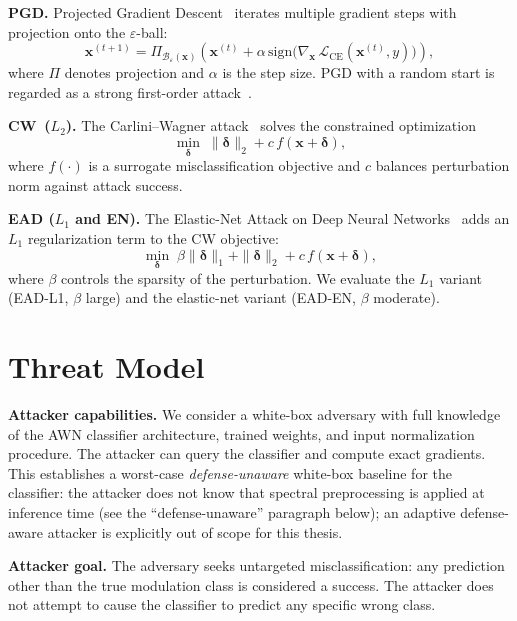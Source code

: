 \textbf{PGD.}
Projected Gradient Descent~\cite{madry2018pgd} iterates multiple gradient
steps with projection onto the $\varepsilon$-ball:
\begin{equation}
  \mathbf{x}^{(t+1)} = \Pi_{\mathcal{B}_\varepsilon(\mathbf{x})}
    \!\left(\mathbf{x}^{(t)} + \alpha\,\mathrm{sign}\!\bigl(
    \nabla_{\mathbf{x}}\,\mathcal{L}_{\mathrm{CE}}(\mathbf{x}^{(t)}, y)
    \bigr)\right),
\end{equation}
where $\Pi$ denotes projection and $\alpha$ is the step size. PGD with a
random start is regarded as a strong first-order
attack~\cite{croce2020reliable}.

\textbf{CW~($L_2$).}
The Carlini--Wagner attack~\cite{carlini2017towards} solves the constrained
optimization
\begin{equation}
  \min_{\boldsymbol{\delta}}\; \|\boldsymbol{\delta}\|_2 + c\, f(\mathbf{x} + \boldsymbol{\delta}),
\end{equation}
where $f(\cdot)$ is a surrogate misclassification objective and $c$ balances
perturbation norm against attack success.

\textbf{EAD ($L_1$ and EN).}
The Elastic-Net Attack on Deep Neural Networks~\cite{chen2020ead} adds an
$L_1$ regularization term to the CW objective:
\begin{equation}
  \min_{\boldsymbol{\delta}}\; \beta\|\boldsymbol{\delta}\|_1 +
    \|\boldsymbol{\delta}\|_2 + c\, f(\mathbf{x} + \boldsymbol{\delta}),
\end{equation}
where $\beta$ controls the sparsity of the perturbation. We evaluate the
$L_1$ variant (EAD-L1, $\beta$ large) and the elastic-net variant (EAD-EN,
$\beta$ moderate).

\section{Threat Model}

\textbf{Attacker capabilities.}
We consider a white-box adversary with full knowledge of the AWN classifier
architecture, trained weights, and input normalization procedure. The
attacker can query the classifier and compute exact gradients. This
establishes a worst-case \emph{defense-unaware} white-box baseline for
the classifier: the attacker does not know that spectral preprocessing
is applied at inference time (see the ``defense-unaware'' paragraph
below); an adaptive defense-aware attacker is explicitly out of scope
for this thesis.

\textbf{Attacker goal.}
The adversary seeks untargeted misclassification: any prediction other than
the true modulation class is considered a success. The attacker does not
attempt to cause the classifier to predict any specific wrong class.

